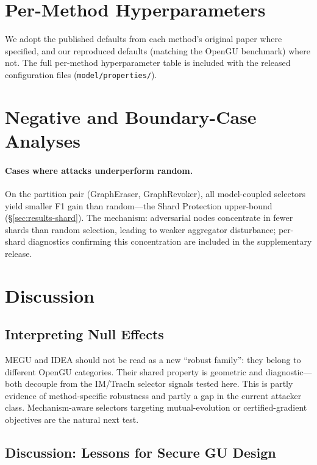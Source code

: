 \section{Per-Method Hyperparameters}
\label{app:hyperparams}
We adopt the published defaults from each method's original paper
where specified, and our reproduced defaults (matching the OpenGU
benchmark) where not. The full per-method hyperparameter table is
included with the released configuration files
(\texttt{model/properties/}).

\section{Negative and Boundary-Case Analyses}
\label{app:negative}

\paragraph{Cases where attacks underperform random.}
On the partition pair (GraphEraser, GraphRevoker), all model-coupled
selectors yield smaller F1 gain than random---the Shard Protection
upper-bound (\S\ref{sec:results-shard}). The mechanism: adversarial
nodes concentrate in fewer shards than random selection, leading to
weaker aggregator disturbance; per-shard diagnostics confirming this
concentration are included in the supplementary release.

\section{Discussion}
\label{sec:conclusion}

\subsection{Interpreting Null Effects}
\label{sec:disc-outliers}

MEGU and IDEA should not be read as a new ``robust family'': they belong
to different OpenGU categories. Their shared property is geometric and
diagnostic---both decouple from the IM/TracIn selector signals tested
here. This is partly evidence of method-specific robustness and partly a
gap in the current attacker class. Mechanism-aware selectors targeting
mutual-evolution or certified-gradient objectives are the natural next
test.

\subsection{Discussion: Lessons for Secure GU Design}
\label{sec:discussion-design}

